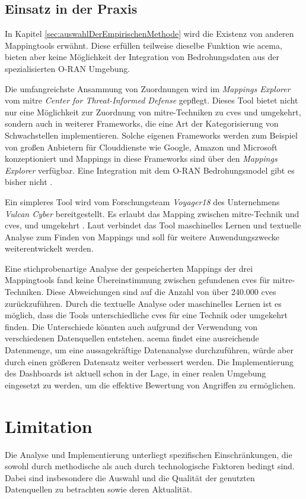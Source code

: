 \subsection{Einsatz in der Praxis}
In Kapitel \ref{sec:auswahlDerEmpirischenMethode} wird die Existenz von anderen Mappingtools erwähnt. Diese erfüllen teilweise dieselbe Funktion wie \gls{acema}, bieten aber keine Möglichkeit der Integration von Bedrohungsdaten aus der spezialisierten O-RAN Umgebung. 
\par Die umfangreichste Ansammung von Zuordnungen wird im \textit{Mappings Explorer} vom \gls{mitre} \textit{Center for Threat-Informed Defense} gepflegt. Dieses Tool bietet nicht nur eine Möglichkeit zur Zuordnung von \gls{mitre}-Techniken zu \glspl{cve} und umgekehrt, sondern auch in weiterer Frameworks, die eine Art der Kategorisierung von Schwachstellen implementieren. Solche eigenen Frameworks werden zum Beispiel von großen Anbietern für Clouddienste wie Google, Amazon und Microsoft konzeptioniert und Mappings in diese Frameworks sind über den \textit{Mappings Explorer} verfügbar. Eine Integration mit dem O-RAN Bedrohungsmodel gibt es bisher nicht \autocite{HomeMappingsExplorer}.
\par Ein simpleres Tool wird vom Forschungsteam \textit{Voyager18} des Unternehmens \textit{Vulcan Cyber} bereitgestellt. Es erlaubt das Mapping zwischen \gls{mitre}-Technik und \glspl{cve}, und umgekehrt \autocite{Vulcan}. Laut \autocite{keizmanMITREATTCKFramework2022} verbindet das Tool maschinelles Lernen und textuelle Analyse zum Finden von Mappings und soll für weitere Anwendungszwecke weiterentwickelt werden.
\par Eine stichprobenartige Analyse der gespeicherten Mappings der drei Mappingtools fand keine Übereinstimmung zwischen gefundenen \glspl{cve} für \gls{mitre}-Techniken. Diese Abweichungen sind auf die Anzahl von über 240.000 \glspl{cve} zurückzuführen. Durch die textuelle Analyse oder maschinelles Lernen ist es möglich, dass die Tools unterschiedliche \glspl{cve} für eine Technik oder umgekehrt finden. Die Unterschiede könnten auch aufgrund der Verwendung von verschiedenen Datenquellen entstehen.
\gls{acema} findet eine ausreichende Datenmenge, um eine aussagekräftige Datenanalyse durchzuführen, würde aber durch einen größeren Datensatz weiter verbessert werden. Die Implementierung des Dashboards ist aktuell schon in der Lage, in einer realen Umgebung eingesetzt zu werden, um die effektive Bewertung von Angriffen zu ermöglichen.

\section{Limitation}
\label{sec:limitationen}
Die Analyse und Implementierung unterliegt spezifischen Einschränkungen, die sowohl durch methodische als auch durch technologische Faktoren bedingt sind. Dabei sind insbesondere die Auswahl und die Qualität der genutzten Datenquellen zu betrachten sowie deren Aktualität.
